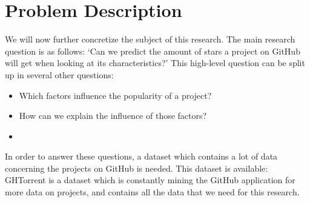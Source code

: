 \section{Problem Description}
    We will now further concretize the subject of this research. 
    The main research question is as follows: `Can we predict the amount of stars a project on GitHub will get when looking at its characteristics?'
    This high-level question can be split up in several other questions:
    \begin{itemize}
        \item Which factors influence the popularity of a project?
        \item How can we explain the influence of those factors?
        \item {} 
    \end{itemize}
    
    In order to answer these questions, a dataset which contains a lot of data concerning the projects on GitHub is needed. 
    This dataset is available: GHTorrent \cite{gousios-2013} is a dataset which is constantly mining the GitHub application for more data on projects, and contains all the data that we need for this research.


